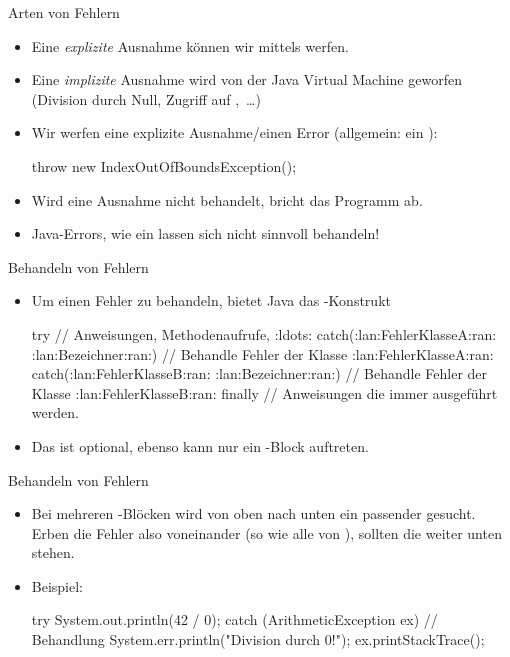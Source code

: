 \begin{frame}[fragile]{Arten von Fehlern}
    \begin{itemize}[<+(1)->]
        \widei
        \item Eine \emph{explizite} Ausnahme können wir mittels  werfen.
        \item Eine \emph{implizite} Ausnahme wird von der Java Virtual Machine geworfen\pause{} (Division durch Null, Zugriff auf ,~\ldots)
        \item Wir werfen eine explizite Ausnahme/einen Error (allgemein: ein ): \pause{}
\begin{plainjava}
throw new IndexOutOfBoundsException();
\end{plainjava}
        \item Wird eine Ausnahme nicht behandelt,\pause{} bricht das Programm ab.
        \item Java-Errors, wie ein  lassen sich nicht sinnvoll behandeln!
    \end{itemize}
\end{frame}

\begin{frame}[fragile]{Behandeln von Fehlern}
    \begin{itemize}[<+(1)->]
        \widei
        \item Um einen Fehler zu behandeln, bietet Java das -Konstrukt
\begin{plainjava}
try {
    // Anweisungen, Methodenaufrufe, :ldots:
} catch(:lan:FehlerKlasseA:ran: :lan:Bezeichner:ran:) {
    // Behandle Fehler der Klasse :lan:FehlerKlasseA:ran:
} catch(:lan:FehlerKlasseB:ran: :lan:Bezeichner:ran:) {
    // Behandle Fehler der Klasse :lan:FehlerKlasseB:ran:
} finally {
    // Anweisungen die immer ausgeführt werden.
}
\end{plainjava}
        \item Das  ist optional, ebenso kann nur ein -Block auftreten.
    \end{itemize}
\end{frame}


\begin{frame}[fragile]{Behandeln von Fehlern}
    \begin{itemize}[<+(1)->]
        \widei
        \item Bei mehreren -Blöcken wird von oben nach unten ein passender gesucht.\pause{} Erben die Fehler also voneinander (so wie alle von ),\pause{} sollten die  weiter unten stehen.
        \item Beispiel:\pause{}
\begin{plainjava}
try {
    System.out.println(42 / 0);
} catch (ArithmeticException ex) {
    // Behandlung
    System.err.println("Division durch 0!");
    ex.printStackTrace();
}
\end{plainjava}
    \end{itemize}
\end{frame}


